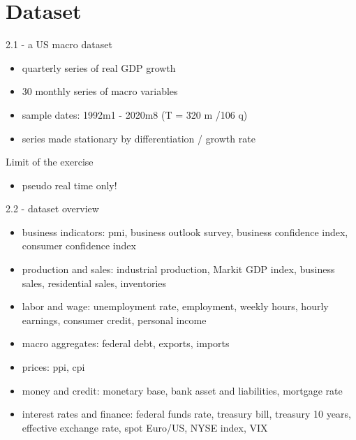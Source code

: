 \section{Dataset}

\begin{frame}{2.1 - a US macro dataset}
	\begin{itemize}
	\item quarterly series of real GDP growth
	\item 30 monthly series of macro variables
	\item sample dates: 1992m1 - 2020m8 (T = 320 m /106 q)
	\item series made stationary by differentiation / growth rate
	\end{itemize}
	\pause
	\begin{alertblock}{Limit of the exercise}
		\begin{itemize}
			\item pseudo real time only!
		\end{itemize}
	\end{alertblock}
\end{frame}

\begin{frame}{2.2 - dataset overview}
	\begin{itemize}
		\item business indicators: pmi, business outlook survey, business confidence index, consumer confidence index
		\item production and sales: industrial production, Markit GDP index, business sales, residential sales, inventories
		\item labor and wage: unemployment rate, employment, weekly hours, hourly earnings, consumer credit, personal income
		\item macro aggregates: federal debt, exports, imports
		\item prices: ppi, cpi
		\item money and credit: monetary base, bank asset and liabilities, mortgage rate
		\item interest rates and finance: federal funds rate, treasury bill, treasury 10 years, effective exchange rate, spot Euro/US, NYSE index, VIX
	\end{itemize}
\end{frame}